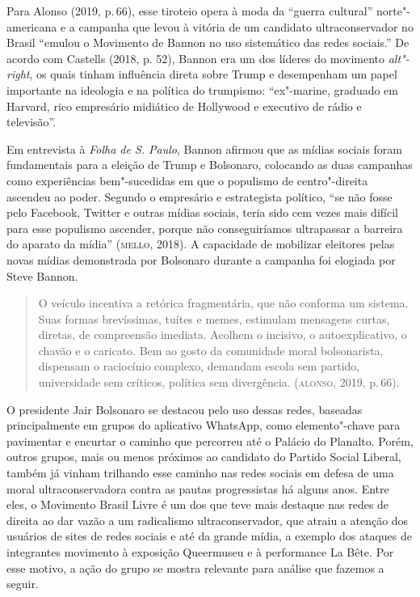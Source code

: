 Para Alonso (2019, p.\,66), esse tiroteio opera à moda da ``guerra
cultural'' norte"-americana e a campanha que levou à vitória de um
candidato ultraconservador no Brasil ``emulou o Movimento de Bannon no
uso sistemático das redes sociais.'' De acordo com Castells (2018, p.
52), Bannon era um dos líderes do movimento \emph{alt"-right}, os quais
tinham influência direta sobre Trump e desempenham um papel importante
na ideologia e na política do trumpismo: ``ex"-marine, graduado em
Harvard, rico empresário midiático de Hollywood e executivo de rádio e
televisão''.

Em entrevista à \emph{Folha de S. Paulo}, Bannon afirmou que as mídias
sociais foram fundamentais para a eleição de Trump e Bolsonaro,
colocando as duas campanhas como experiências bem"-sucedidas em que o
populismo de centro"-direita ascendeu ao poder. Segundo o empresário e
estrategista político, ``se não fosse pelo Facebook, Twitter e outras
mídias sociais, teria sido cem vezes mais difícil para esse populismo
ascender, porque não conseguiríamos ultrapassar a barreira do aparato da
mídia'' (\textsc{mello}, 2018). A capacidade de mobilizar eleitores pelas novas
mídias demonstrada por Bolsonaro durante a campanha foi elogiada por
Steve Bannon.

\begin{quote}
O veículo incentiva a retórica fragmentária, que não conforma um
sistema. Suas formas brevíssimas, tuítes e memes, estimulam mensagens
curtas, diretas, de compreensão imediata. Acolhem o incisivo, o
autoexplicativo, o chavão e o caricato. Bem ao gosto da comunidade moral
bolsonarista, dispensam o raciocínio complexo, demandam escola sem
partido, universidade sem críticos, política sem divergência. (\textsc{alonso},
2019, p.\,66).
\end{quote}

O presidente Jair Bolsonaro se destacou pelo uso dessas redes, baseadas
principalmente em grupos do aplicativo WhatsApp, como elemento"-chave
para pavimentar e encurtar o caminho que percorreu até o Palácio do
Planalto. Porém, outros grupos, mais ou menos próximos ao candidato do
Partido Social Liberal, também já vinham trilhando esse caminho nas
redes sociais em defesa de uma moral ultraconservadora contra as pautas
progressistas há alguns anos. Entre eles, o Movimento Brasil Livre é um
dos que teve mais destaque nas redes de direita ao dar vazão a um
radicalismo ultraconservador, que atraiu a atenção dos usuários de sites
de redes sociais e até da grande mídia, a exemplo dos ataques de
integrantes movimento à exposição Queermuseu e à performance La Bête.
Por esse motivo, a ação do grupo se mostra relevante para análise que
fazemos a seguir.

